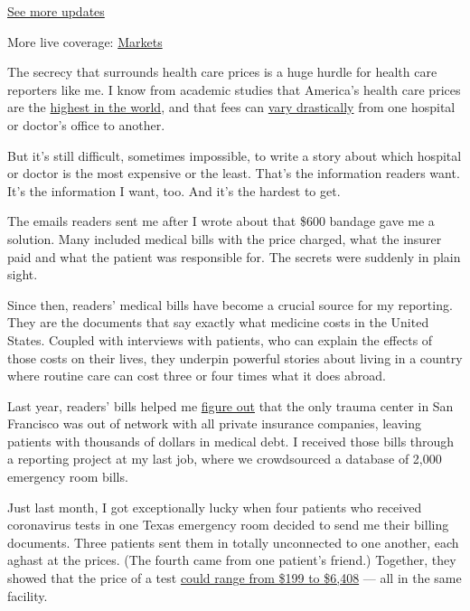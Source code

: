 \href{https://www.nytimes3xbfgragh.onion/2020/09/11/world/covid-19-coronavirus.html?action=click\&pgtype=Article\&state=default\&region=MAIN_CONTENT_1\&context=storylines_live_updates}{See
more updates}

More live coverage:
\href{https://www.nytimes3xbfgragh.onion/live/2020/09/11/business/stock-market-today-coronavirus?action=click\&pgtype=Article\&state=default\&region=MAIN_CONTENT_1\&context=storylines_live_updates}{Markets}

The secrecy that surrounds health care prices is a huge hurdle for
health care reporters like me. I know from academic studies that
America's health care prices are the
\href{https://www.healthaffairs.org/doi/full/10.1377/hlthaff.22.3.89\#:~:text=It's\%20The\%20Prices\%2C\%20Stupid\%3A\%20Why,From\%20Other\%20Countries\%20\%7C\%20Health\%20Affairs}{highest
in the world}, and that fees can
\href{https://www.nytimes3xbfgragh.onion/2019/04/30/upshot/health-care-huge-price-discrepancies.html}{vary
drastically} from one hospital or doctor's office to another.

But it's still difficult, sometimes impossible, to write a story about
which hospital or doctor is the most expensive or the least. That's the
information readers want. It's the information I want, too. And it's the
hardest to get.

The emails readers sent me after I wrote about that \$600 bandage gave
me a solution. Many included medical bills with the price charged, what
the insurer paid and what the patient was responsible for. The secrets
were suddenly in plain sight.

Since then, readers' medical bills have become a crucial source for my
reporting. They are the documents that say exactly what medicine costs
in the United States. Coupled with interviews with patients, who can
explain the effects of those costs on their lives, they underpin
powerful stories about living in a country where routine care can cost
three or four times what it does abroad.

Last year, readers' bills helped me
\href{https://www.vox.com/policy-and-politics/2019/1/7/18137967/er-bills-zuckerberg-san-francisco-general-hospital}{figure
out} that the only trauma center in San Francisco was out of network
with all private insurance companies, leaving patients with thousands of
dollars in medical debt. I received those bills through a reporting
project at my last job, where we crowdsourced a database of 2,000
emergency room bills.

Just last month, I got exceptionally lucky when four patients who
received coronavirus tests in one Texas emergency room decided to send
me their billing documents. Three patients sent them in totally
unconnected to one another, each aghast at the prices. (The fourth came
from one patient's friend.) Together, they showed that the price of a
test
\href{https://www.nytimes3xbfgragh.onion/2020/06/29/upshot/coronavirus-tests-unpredictable-prices.html}{could
range from \$199 to \$6,408} --- all in the same facility.

